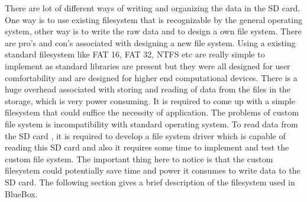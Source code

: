 There are lot of different ways of writing and organizing the data in the SD card. One way is to use existing filesystem that is recognizable by the general operating system, other way is to write the raw data and to design a own file system. There are pro's and con's associated with designing a new file system. Using a existing standard filesystem like FAT 16, FAT 32, NTFS etc are really simple to implement as standard libraries are present but they were all designed for user comfortability and are designed for higher end computational devices. There is a huge overhead associated with storing and reading of data from the files in the storage, which is very power consuming. It is required to come up with a simple filesystem that could suffice the necessity of application. The problems of custom file system is incompatibility with standard operating system. To read data from the SD card , it is required to develop a file system driver which is capable of reading this SD card and also it requires some time to implement and test the custom file system. The important thing here to notice is that the custom filesystem could potentially save time and power it consumes to write data to the SD card. The following section gives a brief description of the filesystem used in BlueBox. 

